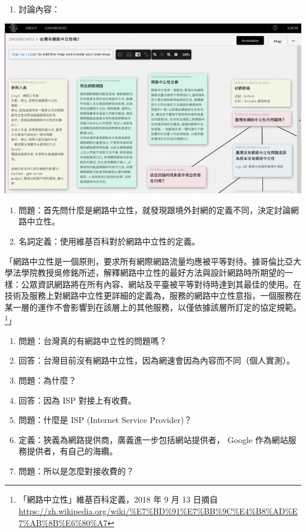 \documentclass[12pt,a4paper]{article}
\begin{document}
\begin{enumerate}
\begin{enumerate}
\begin{enumerate}
\begin{enumerate}
\item 討論內容：
\end{enumerate}
\end{enumerate}
\begin{center}
\includegraphics[width=.9\linewidth]{./images/net-neutrality1.png}
\end{center}
\begin{enumerate}
\item 問題：首先問什麼是網路中立性，就發現跟境外封網的定義不同，決定討論網路中立性。
\item 名詞定義：使用維基百科對於網路中立性的定義。
\end{enumerate}
「網路中立性是一個原則，要求所有網際網路流量均應被平等對待。據哥倫比亞大學法學院教授吳修銘所述，解釋網路中立性的最好方法與設計網路時所期望的一樣：公眾資訊網路將在所有內容、網站及平臺被平等對待時達到其最佳的使用。在技術及服務上對網路中立性更詳細的定義為，服務的網路中立性意指，一個服務在某一層的運作不會影響到在該層上的其他服務，以僅依據該層所訂定的協定規範。\footnote{「網路中立性」維基百科定義，2018 年 9 月 13 日摘自 \url{https://zh.wikipedia.org/wiki/\%E7\%BD\%91\%E7\%BB\%9C\%E4\%B8\%AD\%E7\%AB\%8B\%E6\%80\%A7}}」
\begin{enumerate}
\item 問題：台灣真的有網路中立性的問題嗎？
\item 回答：台灣目前沒有網路中立性，因為網速會因為內容而不同（個人實測）。
\item 問題：為什麼？
\item 回答：因為 ISP 對接上有收費。
\item 問題：什麼是 ISP (Internet Service Provider)？
\item 定義：狹義為網路提供商，廣義進一步包括網站提供者， Google 作為網站服務提供者，有自己的海纜。
\item 問題：所以是怎麼對接收費的？

\end{enumerate}
\end{enumerate}
\end{enumerate}
\end{document}

